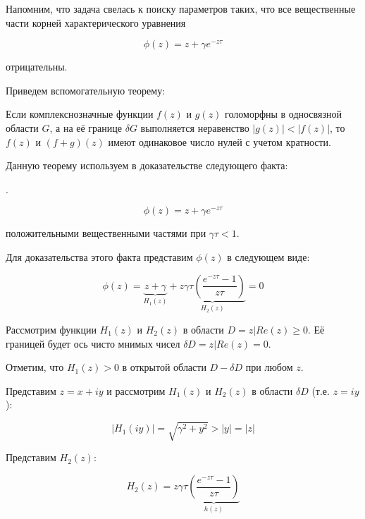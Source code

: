 Напомним, что задача свелась к поиску параметров таких, что все вещественные части корней характерического уравнения

\begin{equation}
\phi(z) = z + \gamma e^{-z \tau}
\end{equation}

отрицательны.

Приведем вспомогательную теорему:

 Если комплекснозначные функции $f(z)$ и $g(z)$ голоморфны в односвязной области $G$, а на её границе $\delta G$ выполняется неравенство $|g(z)| < |f(z)|$, то $f(z)$ и $(f+g)(z)$ имеют одинаковое число нулей с учетом кратности.

Данную теорему используем в доказательстве следующего факта:

.

\begin{equation*}
\phi(z) = z + \gamma e^{-z \tau}
\end{equation*}

положительными вещественными частями при $\gamma \tau < 1$.

Для доказательства этого факта представим $\phi (z)$ в следующем виде:

\begin{equation}
\phi(z) = \underbrace{{z + \gamma}}_{H_1(z)} + \underbrace{z \gamma \tau \left(\dfrac{e^{-z \tau} - 1}{z \tau} \right)}_{H_2(z)} = 0
\end{equation}

Рассмотрим функции $H_1(z)$ и $H_2(z)$ в области $D = {z|Re(z) \geq 0}$. Её границей будет ось чисто мнимых чисел $\delta D = {z|Re(z)=0}$.

Отметим, что $H_1(z)>0$ в открытой области $D-\delta D$ при любом $z$.

Представим $z=x+iy$ и рассмотрим $H_1(z)$ и $H_2(z)$ в области $\delta D$ (т.е. $z=iy$):

\begin{equation}\label{eq:h1}
|H_1(iy)| = \sqrt{\gamma^2 + y^2} > |y| = |z|
\end{equation}

Представим $H_2(z)$:

\begin{equation}
H_2(z) = z \gamma \tau \underbrace{\left(\dfrac{e^{-z \tau} - 1}{z \tau} \right)}_{h(z)}
\end{equation}

